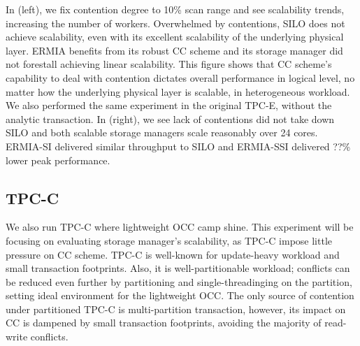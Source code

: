 In (left), we fix contention degree to 10\% scan range and see scalability trends, increasing the number of workers. Overwhelmed by contentions, SILO does not achieve scalability, even with its excellent scalability of the underlying physical layer. ERMIA benefits from its robust CC scheme and its storage manager did not forestall achieving linear scalability. This figure shows that CC scheme's capability to deal with contention dictates overall performance in logical level, no matter how the underlying physical layer is scalable, in heterogeneous workload. We also performed the same experiment in the original TPC-E, without the analytic transaction. In (right), we see lack of contentions did not take down SILO and both scalable storage managers scale reasonably over 24 cores. ERMIA-SI delivered similar throughput to SILO and ERMIA-SSI delivered ??\% lower peak performance. 

\subsection{TPC-C} 
We also run TPC-C where lightweight OCC camp shine. This experiment will be focusing on evaluating storage manager's scalability, as TPC-C impose little pressure on CC scheme. TPC-C is well-known for update-heavy workload and small transaction footprints. Also, it is well-partitionable workload; conflicts can be reduced even further by partitioning and single-threadinging on the partition, setting ideal environment for the lightweight OCC. The only source of contention under partitioned TPC-C is multi-partition transaction, however, its impact on CC is dampened by small transaction footprints, avoiding the majority of read-write conflicts. %

